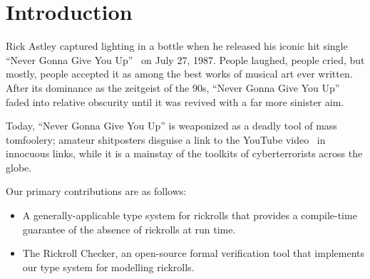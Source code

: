 \section{Introduction}
\label{sec:intro}

Rick Astley captured lighting in a bottle when he released his iconic hit
single ``Never Gonna Give You Up''~\cite{NeverGonnaGiveYouUpWiki} on July 27,
1987.
People laughed, people cried, but mostly, people accepted it as among the best
works of musical art ever written.
After its dominance as the zeitgeist of the 90s, ``Never Gonna Give You Up''
faded into relative obscurity until it was revived with a far more sinister
aim.

Today, ``Never Gonna Give You Up'' is weaponized as a deadly tool of mass
tomfoolery; amateur shitposters disguise a link to the YouTube
video~\cite{NeverGonnaGiveYouUpYouTube} in innocuous links, while it is a
mainstay of the toolkits of cyberterrorists across the globe.

Our primary contributions are as follows:

\begin{itemize}
  \item A generally-applicable type system for rickrolls that
    provides a compile-time guarantee of the absence of rickrolls at run time.
  \item The Rickroll Checker, an open-source formal verification tool that
    implements our type system for modelling rickrolls.
\end{itemize}


